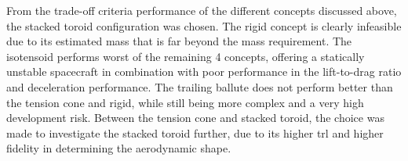 From the trade-off criteria performance of the different concepts discussed above, the stacked toroid configuration was chosen. The rigid concept is clearly infeasible due to its estimated mass that is far beyond the mass requirement. The isotensoid performs worst of the remaining 4 concepts, offering a statically unstable spacecraft in combination with poor performance in the lift-to-drag ratio and deceleration performance. The trailing ballute does not perform better than the tension cone and rigid, while still being more complex and a very high development risk. Between the tension cone and stacked toroid, the choice was made to investigate the stacked toroid further, due to its higher \gls{trl} and higher fidelity in determining the aerodynamic shape.